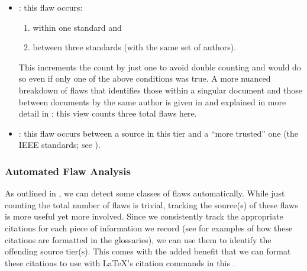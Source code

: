 \begin{itemize}
    \item \textbf{\stds{}}: this flaw occurs:
          \begin{enumerate}
              \item within one standard and
              \item between three standards (with the same set of authors).
          \end{enumerate}
          This increments the count by just one to avoid double counting and
          would do so even if only one of the above conditions was true. A more
          nuanced breakdown of flaws that identifies those within a
          singular document and those between documents by the same author is
          given in  and explained in more detail in
          ; this view counts three total flaws here.
    \item \textbf{\texts{}}: this flaw occurs between a source in this tier and
          a ``more trusted'' one (the IEEE standards; see ).
\end{itemize}

\subsubsection{Automated Flaw Analysis}
\label{auto-flaw-analysis}

As outlined in , we can detect some classes of flaws
automatically. While just counting the total number of flaws is trivial,
tracking the source(s) of these flaws is more useful yet more involved. Since
we consistently track the appropriate citations for each piece of information
we record (see  for examples
of how these citations are formatted in the glossaries), we can use them to
identify the offending source tier(s). This comes with the added benefit that
we can format these citations to use with \LaTeX{}'s citation commands in this
\docType{}.

